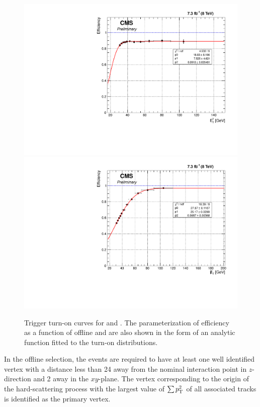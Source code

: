 \begin{figure}[!h]
\centering
{\includegraphics[scale=0.35]{figures/range_updated_photon.pdf}}
{\includegraphics[scale=0.35]{figures/range_updated_met.pdf}}
\caption{Trigger turn-on curves for \etg and \met. The parameterization of efficiency as a function of offline \etg and \met are also shown in the form of an analytic function fitted to the turn-on distributions.}
\label{fig:triggereff}
\end{figure}

    In the offline selection, the events are required to have at least one well identified vertex with a distance less than 24 \cm away from the nominal interaction point in $z$-direction and 2 \cm away in the $xy$-plane. The vertex corresponding to the origin of the hard-scattering process with the largest value of $\sum p_{\mathrm{T}}^2$ of all associated tracks is identified as the primary vertex.

